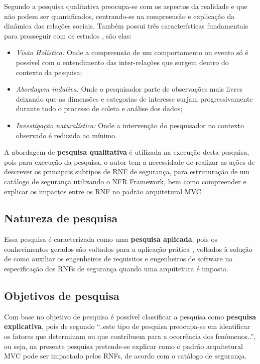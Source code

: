 Segundo \cite{gerhardt2009metodos} a pesquisa qualitativa preocupa-se com os aspectos da realidade e que não podem ser quantificados, centrando-se na compreensão e explicação da dinâmica das relações sociais. Também possui três características fundamentais para prosseguir com os estudos \cite{mazzotti1991planejamento}, são elas:

\begin{itemize}
	\item \textit{Visão Holística:} Onde a compreensão de um comportamento ou evento só é possível com o entendimento das inter-relações que surgem dentro do contexto da pesquisa;
	\item \textit{Abordagem indutiva:} Onde o pesquisador parte de observações mais livres deixando que as dimensões e categorias de interesse surjam progressivamente durante todo o processo de coleta e análise dos dados;
	\item \textit{Investigação naturalística:} Onde a intervenção do pesquisador no contexto observado é reduzida ao mínimo.
\end{itemize}

A abordagem de \textbf{pesquisa qualitativa} é utilizada na execução desta pesquisa, pois para execução da pesquisa, o autor tem a necessidade de realizar as ações de descrever os principais subtipos de RNF de segurança, para estruturação de um catálogo de segurança utilizando o NFR Framework, bem como compreender e explicar os impactos entre os RNF no padrão arquitetural MVC. 

\subsection{Natureza de pesquisa}

Essa pesquisa é caracterizada como uma \textbf{pesquisa aplicada}, pois os conhecimentos gerados são voltados para a aplicação prática \cite{gerhardt2009metodos}, voltados à solução de como auxiliar os engenheiros de requisitos e engenheiros de software na especificação dos RNFs de segurança quando uma arquitetura é imposta. 

\subsection{Objetivos de pesquisa}

Com base no objetivo de pesquisa é possível classificar a pesquisa como \textbf{pesquisa explicativa}, pois de segundo \cite{gil2002elaborar} “..este tipo de pesquisa preocupa-se em identificar os fatores que determinam ou que contribuem para a ocorrência dos fenômenos..”, ou seja, na presente pesquisa pretende-se explicar como o padrão arquitetural MVC pode ser impactado pelos RNFs, de acordo com o catálogo de segurança.

